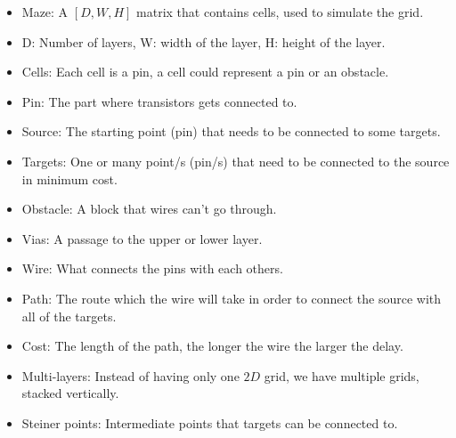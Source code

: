 \begin{itemize}
	\item Maze: A $[D,W,H]$ matrix that contains cells, used to simulate the grid.
    \item D: Number of layers, W: width of the layer, H: height of the layer.
    \item Cells: Each cell is a pin, a cell could represent a pin or an obstacle.
	\item Pin: The part where transistors gets connected to.
	\item Source: The starting point (pin) that needs to be connected to some targets.
	\item Targets: One or many point/s (pin/s) that need to be connected to the source in minimum cost.
	\item Obstacle: A block that wires can't go through.
	\item Vias: A passage to the upper or lower layer.
	\item Wire: What connects the pins with each others.
	\item Path: The route which the wire will take in order to connect the source with all of the targets.
	\item Cost: The length of the path, the longer the wire the larger the delay.
	\item Multi-layers: Instead of having only one $2D$ grid, we have multiple grids, stacked vertically.
	\item Steiner points: Intermediate points that targets can be connected to.
\end{itemize}
